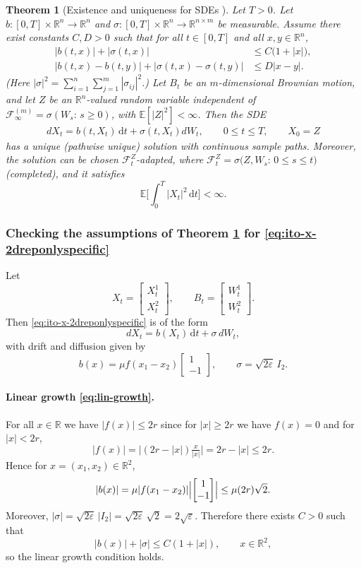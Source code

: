 \documentclass[11pt]{article}
\newcommand{\R}{\mathbb{R}}
\newcommand{\E}{\mathbb{E}}
\newcommand{\1}{\mathbbm{1}}
\newcommand{\dt}{\,\mathrm{d}t}
\newcommand{\mc}[1]{\mathcal{#1}}
\theoremstyle{plain}
\newtheorem{theorem}{Theorem}[section]
\theoremstyle{definition}
\theoremstyle{remark}
\begin{document}
\begin{theorem}[Existence and uniqueness for SDEs {\citep[Thm.\ 5.2.1]{oksendal2013sde}}]\label{thm:oksendal-5-2-1}
Let $T>0$. Let $b:[0,T]\times\R^n\to\R^n$ and $\sigma:[0,T]\times\R^n\to\R^{n\times m}$ be measurable.
Assume there exist constants $C,D>0$ such that for all $t\in[0,T]$ and all $x,y\in\R^n$,
\begin{align}
|b(t,x)|+|\sigma(t,x)|
&\le C\bigl(1+|x|\bigr),
\label{eq:lin-growth}\\
|b(t,x)-b(t,y)|+|\sigma(t,x)-\sigma(t,y)|
&\le D|x-y|.
\label{eq:lipschitz}
\end{align}
(Here $|\sigma|^2=\sum_{i=1}^n\sum_{j=1}^m |\sigma_{ij}|^2$.)
Let $B_t$ be an $m$-dimensional Brownian motion, and let $Z$ be an $\R^n$-valued random variable
independent of $\mc{F}^{(m)}_\infty=\sigma(W_s:\,s\ge 0)$, with $\E[|Z|^2]<\infty$.
Then the SDE
\begin{align}
dX_t=b(t,X_t)\dt+\sigma(t,X_t)dW_t,\qquad 0\le t\le T,\qquad X_0=Z
\label{eq:sde-general}
\end{align}
has a unique (pathwise unique) solution with continuous sample paths. Moreover, the solution can be chosen
$\mc{F}^Z_t$-adapted, where $\mc{F}^Z_t=\sigma\bigl(Z,W_s:\,0\le s\le t\bigr)$ (completed), and it satisfies
\[
\E\biggl[\int_0^T |X_t|^2\dt\biggr]<\infty.
\]
\end{theorem}

\subsubsection{Checking the assumptions of Theorem \ref{thm:oksendal-5-2-1} for \eqref{eq:ito-x-2dreponlyspecific}}
Let
\[
X_t=\begin{bmatrix}X_t^1\\ X_t^2\end{bmatrix},
\qquad
B_t=\begin{bmatrix}W_t^1\\ W_t^2\end{bmatrix}.
\]
Then \eqref{eq:ito-x-2dreponlyspecific} is of the form
\[
dX_t=b(X_t)\dt+\sigma\,dW_t,
\]
with drift and diffusion given by
\[
b(x)=\mu f(x_1-x_2)\begin{bmatrix}1\\-1\end{bmatrix},
\qquad
\sigma=\sqrt{2\varepsilon}\,I_2.
\]

\paragraph{Linear growth \eqref{eq:lin-growth}.}
For all $x\in\R$ we have $|f(x)|\le 2r$ since for $|x|\ge 2r$ we have $f(x)=0$ and for $|x|<2r$,
\[
|f(x)|=\bigl|(2r-|x|)\tfrac{x}{|x|}\bigr|=2r-|x|\le 2r.
\]
Hence for $x=(x_1,x_2)\in\R^2$,
\[
|b(x)|
=
\mu |f(x_1-x_2)|\Bigl|\begin{bmatrix}1\\-1\end{bmatrix}\Bigr|
\le
\mu(2r)\sqrt{2}.
\]
Moreover, $|\sigma|=\sqrt{2\varepsilon}\,|I_2|=\sqrt{2\varepsilon}\,\sqrt{2}=2\sqrt{\varepsilon}$.
Therefore there exists $C>0$ such that
\[
|b(x)|+|\sigma|\le C(1+|x|),\qquad x\in\R^2,
\]
so the linear growth condition holds.
\end{document}
